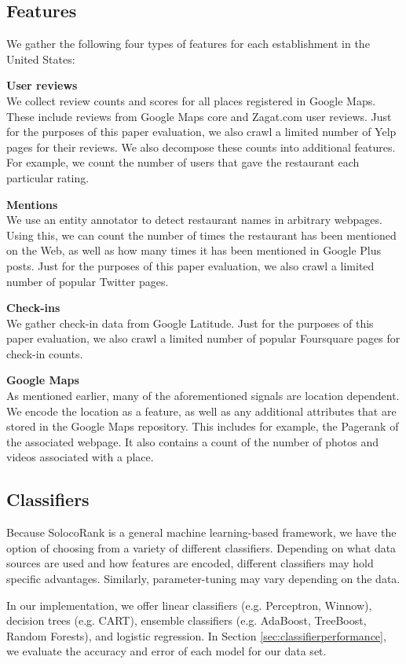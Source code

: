 \subsection{Features}
\label{sec:features}
We gather the following four types of features for each establishment
in the United States:
\squishlist
	\item \textbf{User reviews}\\
  We collect review counts and scores for all places registered in Google Maps.
  These include reviews from Google Maps core and Zagat.com user reviews.
  Just for the purposes of this paper evaluation, we also crawl a limited number of Yelp pages for their reviews.
  We also decompose these counts into additional features.
  For example, we count the number of users that gave the restaurant each particular rating.
	\item \textbf{Mentions}\\
  We use an entity annotator to detect restaurant names in arbitrary webpages.
  Using this, we can count the number of times the restaurant has been mentioned on the Web,
  as well as how many times it has been mentioned in Google Plus posts.
  Just for the purposes of this paper evaluation, we also crawl a limited number of popular Twitter pages.
	\item \textbf{Check-ins}\\
  We gather check-in data from Google Latitude.
  Just for the purposes of this paper evaluation, we also crawl a limited number
  of popular Foursquare pages for check-in counts.
  \item \textbf{Google Maps}\\
  As mentioned earlier, many of the aforementioned signals are location dependent.
  We encode the location as a feature, as well as any additional attributes that are
  stored in the Google Maps repository.
  This includes for example, the Pagerank of the associated webpage.
  It also contains a count of the number of photos and videos associated with a place.
\squishend

\subsection{Classifiers}
Because SolocoRank is a general machine learning-based framework,
we have the option of choosing from a variety of different classifiers.
Depending on what data sources are used and how features are encoded,
different classifiers may hold specific advantages.
Similarly, parameter-tuning may vary depending on the data.

In our implementation, we offer linear classifiers (e.g. Perceptron, Winnow),
decision trees (e.g. CART), ensemble classifiers (e.g. AdaBoost, TreeBoost, Random Forests),
and logistic regression.
In Section \ref{sec:classifierperformance}, we evaluate the accuracy and error
of each model for our data set.
